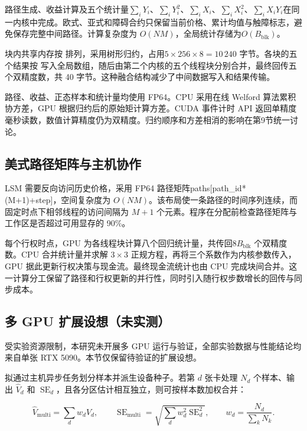 \documentclass[UTF8,a4paper,zihao=5,fontset=none]{ctexart}
\begin{document}
路径生成、收益计算及五个统计量$\sum_iY_i$、$\sum_iY_i^2$、$\sum_iX_i$、$\sum_iX_i^2$、$\sum_iX_iY_i$在同一内核中完成。欧式、亚式和障碍合约只保留当前价格、累计均值与触障标志，避免保存完整中间路径。计算复杂度为 $O(NM)$，全局统计存储为$O(B_{\mathrm{blk}})$。


块内共享内存按 {\small\ttfamily [统计量][线程]} 排列，采用树形归约，占用$5\times256\times8=10\,240$ 字节。各块的五个结果按 {\small\ttfamily [线程块][统计量]}写入全局数组，随后由第二个内核的五个线程块分别合并，最终回传五个双精度数，共 40 字节。这种融合结构减少了中间数据写入和结果传输。


路径、收益、正态样本和统计量均使用 FP64。CPU 采用在线 Welford 算法累积协方差，GPU 根据归约后的原始矩计算方差。CUDA 事件计时 API 返回单精度毫秒读数，数值计算精度仍为双精度。归约顺序和方差相消的影响在第9节统一讨论。


\subsection{美式路径矩阵与主机协作}

LSM 需要反向访问历史价格，采用 FP64 路径矩阵{\small\ttfamily paths[pa\allowbreak{}th\_\allowbreak{}id*(M\allowbreak{}+1)+step\allowbreak{}]}，空间复杂度为 $O(NM)$。该布局使一条路径的时间序列连续，而固定时点下相邻线程的访问间隔为 $M+1$ 个元素。程序在分配前检查路径矩阵与工作区是否超过可用显存的 90\%。


每个行权时点，GPU 为各线程块计算八个回归统计量，共传回$8B_{\mathrm{blk}}$ 个双精度数。CPU 合并统计量并求解 $3\times3$ 正规方程，再将三个系数作为内核参数传入，GPU 据此更新行权决策与现金流。最终现金流统计也由 CPU 完成块间合并。这一计算分工保留了路径和行权更新的并行性，同时引入随行权步数增长的回传与同步成本。


\subsection{多 GPU 扩展设想（未实测）}

受实验资源限制，本研究未开展多 GPU 运行与验证，全部实验数据与性能结论均来自单张 RTX 5090。本节仅保留待验证的扩展设想。


拟通过主机异步任务划分样本并派生设备种子。若第 $d$ 张卡处理 $N_d$ 个样本、输出 $\widehat V_d$ 和 $\operatorname{SE}_d$，且各分区估计相互独立，则可按样本数加权合并：


\nopagebreak[4]
\begin{equation}
\label{eq:11}
\widehat V_{\mathrm{multi}}=\sum_d w_d\widehat V_d,\qquad
\operatorname{SE}_{\mathrm{multi}}=
\sqrt{\sum_d w_d^2\operatorname{SE}_d^2},\qquad
w_d=\frac{N_d}{\sum_kN_k}.
\end{equation}
\end{document}
